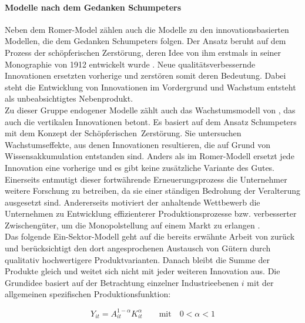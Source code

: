 \paragraph{Modelle nach dem Gedanken Schumpeters}\label{sec:schumpeter}
Neben dem Romer-Model z{\"a}hlen auch die Modelle zu den innovationsbasierten Modellen, die dem Gedanken Schumpeters folgen. Der Ansatz beruht auf dem Prozess der schöpferischen Zerstörung, deren Idee von ihm erstmals in seiner Monographie von 1912 entwickelt wurde \citep{Schumpeter.1934a}. Neue qualit{\"a}tsverbessernde Innovationen ersetzten vorherige und zerst{\"o}ren somit deren Bedeutung. Dabei steht die Entwicklung von Innovationen im Vordergrund und Wachstum entsteht als unbeabsichtigtes Nebenprodukt.\\


Zu dieser Gruppe endogener Modelle zählt auch das Wachstumsmodell von \citet{Aghion.1992}, das auch die vertikalen Innovationen betont. Es basiert auf dem Ansatz Schumpeters mit dem Konzept der Sch{\"o}pferischen~Zerst{\"o}rung. Sie untersuchen Wachstumseffekte, aus denen Innovationen resultieren, die auf Grund von Wissensakkumulation entstanden sind. Anders als im Romer-Modell ersetzt jede Innovation eine vorherige und es gibt keine zus{\"a}tzliche Variante des Gutes. Einerseits entmutigt dieser fortw{\"a}hrende Erneuerungsprozess die Unternehmer weitere Forschung zu betreiben, da sie einer st{\"a}ndigen Bedrohung der Veralterung ausgesetzt sind. Andererseits motiviert der anhaltende Wettbewerb die Unternehmen zu Entwicklung effizienterer Produktionsprozesse bzw. verbesserter Zwischeng{\"u}ter, um die Monopolstellung auf einem Markt zu erlangen \citep{Aghion.1992}.\\ 


Das folgende Ein-Sektor-Modell geht auf die bereits erwähnte Arbeit von \citet{Aghion.1992,Aghion.1998} zur{\"u}ck und ber{\"u}cksichtigt den dort angesprochenen Austausch von G{\"u}tern durch qualitativ hochwertigere Produktvarianten. Danach bleibt die Summe der Produkte gleich und weitet sich nicht mit jeder weiteren Innovation aus. Die Grundidee basiert auf der Betrachtung einzelner Industrieebenen $i$ mit der allgemeinen spezifischen Produktionsfunktion:

	\begin{equation}
		Y_{it}=A_{it}^{1-\alpha}K_{it}^\alpha \qquad \text{mit}\quad 0 < \alpha < 1 \label{Produktionsfunktion Industrien Schumpeter}
	\end{equation}

